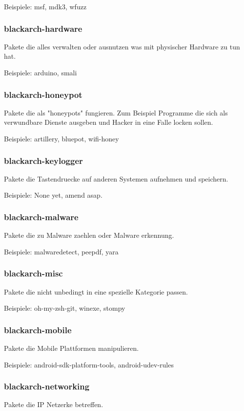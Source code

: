 \documentclass[a4paper, oneside, 11pt]{book}
\begin{document}
Beispiele: msf, mdk3, wfuzz

\subsubsection{blackarch-hardware}
Pakete die alles verwalten oder ausnutzen was mit
physischer Hardware zu tun hat.

Beispiele: arduino, smali

\subsubsection{blackarch-honeypot}
Pakete die als "honeypots" fungieren. Zum Beispiel Programme
die sich als verwundbare Dienste ausgeben und Hacker in eine Falle locken
sollen.

Beispiele: artillery, bluepot, wifi-honey

\subsubsection{blackarch-keylogger}
Pakete die Tastendruecke auf anderen Systemen aufnehmen und speichern.

Beispiele: None yet, amend asap.

\subsubsection{blackarch-malware}
Pakete die zu Malware zaehlen oder Malware erkennung.

Beispiele: malwaredetect, peepdf, yara

\subsubsection{blackarch-misc}
Pakete die nicht unbedingt in eine spezielle Kategorie passen.

Beispiele: oh-my-zsh-git, winexe, stompy

\subsubsection{blackarch-mobile}
Pakete die Mobile Plattformen manipulieren.

Beispiele: android-sdk-platform-tools, android-udev-rules

\subsubsection{blackarch-networking}
Pakete die IP Netzerke betreffen.
\end{document}
